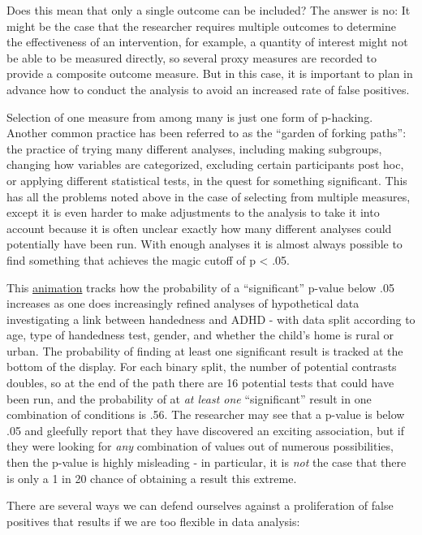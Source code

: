 \documentclass{krantz}
\begin{document}
Does this mean that only a single outcome can be included? The answer is no: It might be the case that the researcher requires multiple outcomes to determine the effectiveness of an intervention, for example, a quantity of interest might not be able to be measured directly, so several proxy measures are recorded to provide a composite outcome measure. But in this case, it is important to plan in advance how to conduct the analysis to avoid an increased rate of false positives.

Selection of one measure from among many is just one form of p-hacking. Another common practice has been referred to as the ``garden of forking paths'': the practice of trying many different analyses, including making subgroups, changing how variables are categorized, excluding certain participants post hoc, or applying different statistical tests, in the quest for something significant. This has all the problems noted above in the case of selecting from multiple measures, except it is even harder to make adjustments to the analysis to take it into account because it is often unclear exactly how many different analyses could potentially have been run. With enough analyses it is almost always possible to find something that achieves the magic cutoff of p \textless{} .05.

This \href{https://figshare.com/articles/figure/The_Garden_of_Forking_Paths/2100379}{animation} tracks how the probability of a ``significant'' p-value below .05 increases as one does increasingly refined analyses of hypothetical data investigating a link between handedness and ADHD - with data split according to age, type of handedness test, gender, and whether the child's home is rural or urban. The probability of finding at least one significant result is tracked at the bottom of the display. For each binary split, the number of potential contrasts doubles, so at the end of the path there are 16 potential tests that could have been run, and the probability of at \emph{at least one} ``significant'' result in one combination of conditions is .56. The researcher may see that a p-value is below .05 and gleefully report that they have discovered an exciting association, but if they were looking for \emph{any} combination of values out of numerous possibilities, then the p-value is highly misleading - in particular, it is \emph{not} the case that there is only a 1 in 20 chance of obtaining a result this extreme.

There are several ways we can defend ourselves against a proliferation of false positives that results if we are too flexible in data analysis:
\end{document}
